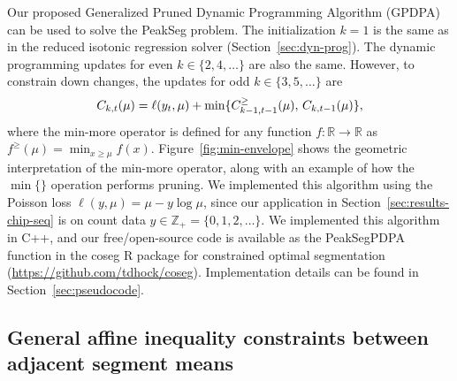 \documentclass{article}
\newcommand{\ZZ}{\mathbb Z}
\newcommand{\RR}{\mathbb R}
\begin{document}
Our proposed Generalized Pruned Dynamic Programming Algorithm (GPDPA)
can be used to solve the PeakSeg problem. The initialization $k=1$ is
the same as in the reduced isotonic regression solver
(Section~\ref{sec:dyn-prog}). The dynamic programming updates for even
$k\in\{2, 4, \dots\}$ are also the same. However, to constrain down
changes, the updates for odd $k\in\{3, 5, \dots\}$ are
\begin{equation}
  C_{k,t}(\mu) = \ell(y_t, \mu) + \min\{
  C_{k-1,t-1}^\geq(\mu),\, C_{k,t-1}(\mu)
  \},
\end{equation}
where the min-more operator is defined for any function $f:\RR\rightarrow\RR$ as
$f^\geq(\mu) = \min_{x\geq \mu} f(x)$. Figure~\ref{fig:min-envelope}
shows the geometric interpretation of the min-more operator, along
with an example of how the $\min\{\}$ operation performs pruning.
We implemented this algorithm using the Poisson loss
$\ell(y, \mu) = \mu - y\log \mu$, since our application in
Section~\ref{sec:results-chip-seq} is on count data
$y\in\ZZ_+ = \{0, 1, 2, \dots\}$.
We implemented this algorithm in C++, and our free/open-source code is
available as the PeakSegPDPA function in the coseg R package for
constrained optimal segmentation
(\url{https://github.com/tdhock/coseg}). Implementation details can be
found in Section~\ref{sec:pseudocode}.

\subsection{General affine inequality constraints
  between adjacent segment means}
\label{sec:general}


\end{document}
